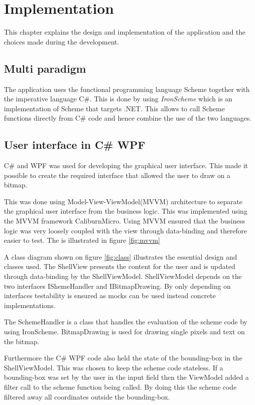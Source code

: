 \chapter{Implementation} 
\label{chp:impl}

This chapter explains the design and implementation of the application and the choices made during the development.

\section{Multi paradigm}
The application uses the functional programming language Scheme together with the imperative language C\#. This is done by using \emph{IronScheme} which is an implementation of Scheme that targets .NET. This allows to call Scheme functions directly from C\# code and hence combine the use of the two languages.

\section{User interface in C\# WPF}
C\# and WPF was used for developing the graphical user interface. This made it possible to create the required interface that allowed the user to draw on a bitmap.

This was done using Model-View-ViewModel(MVVM) architecture to separate the graphical user interface from the business logic. This was implemented using the MVVM framework CaliburnMicro. Using MVVM ensured that the business logic was very loosely coupled with the view through data-binding and therefore easier to test. The is illustrated in figure \ref{fig:mvvm}


A class diagram shown on figure \ref{fig:class} illustrates the essential design and classes used. The ShellView presents the content for the user and is updated through data-binding by the ShellViewModel. ShellViewModel depends on the two interfaces IShemeHandler and IBitmapDrawing. By only depending on interfaces testability is ensured as mocks can be used instead concrete implementations. 

The SchemeHandler is a class that handles the evaluation of the scheme code by using IronScheme. BitmapDrawing is used for drawing single pixels and text on the bitmap.


Furthermore the C\# WPF code also held the state of the bounding-box in the ShellViewModel. This was chosen to keep the scheme code stateless. If a bounding-box was set by the user in the input field then the ViewModel added a filter call to the scheme function being called. By doing this the scheme code filtered away all coordinates outside the bounding-box.

